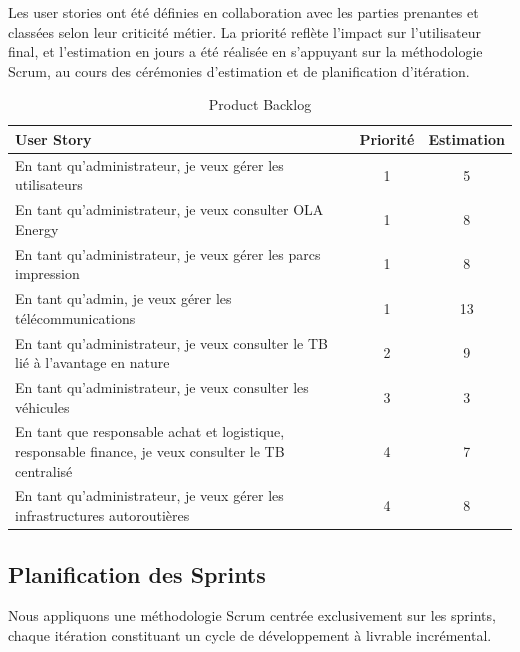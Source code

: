 \documentclass[a4paper,11pt]{report}
\begin{document}
Les user stories ont été définies en collaboration avec les parties prenantes et classées selon leur criticité métier.  
La priorité reflète l’impact sur l’utilisateur final, et l’estimation en jours a été réalisée en s’appuyant sur la méthodologie Scrum, au cours des cérémonies d’estimation et de planification d’itération.  

\begin{table}[h]
\centering
\begin{tabular}{|p{}|c|c|}
\hline
\textbf{User Story} & \textbf{Priorité} & \textbf{Estimation} \\
\hline
En tant qu’administrateur, je veux gérer les utilisateurs & 1 & 5 \\
\hline
En tant qu’administrateur, je veux consulter OLA Energy & 1 & 8 \\
\hline

\hline
En tant qu’administrateur, je veux gérer les parcs impression & 1 & 8 \\
\hline
En tant qu’admin, je veux gérer les télécommunications & 1 & 13 \\
\hline

En tant qu’administrateur, je veux consulter le TB lié à l’avantage en nature & 2 & 9 \\
\hline
En tant qu’administrateur, je veux consulter les véhicules & 3 & 3 \\
\hline

En tant que responsable achat et logistique, responsable finance, je veux consulter le TB centralisé & 4 & 7 \\
\hline
En tant qu’administrateur, je veux gérer les infrastructures autoroutières & 4 & 8 \\
\hline
\end{tabular}
\caption{Product Backlog}
\end{table}

	
\newpage

\subsection{Planification des Sprints}
\renewcommand{\arraystretch}{1.5} %

Nous appliquons une méthodologie Scrum centrée exclusivement sur les sprints, chaque itération constituant un cycle de développement à livrable incrémental.  
\end{document}
